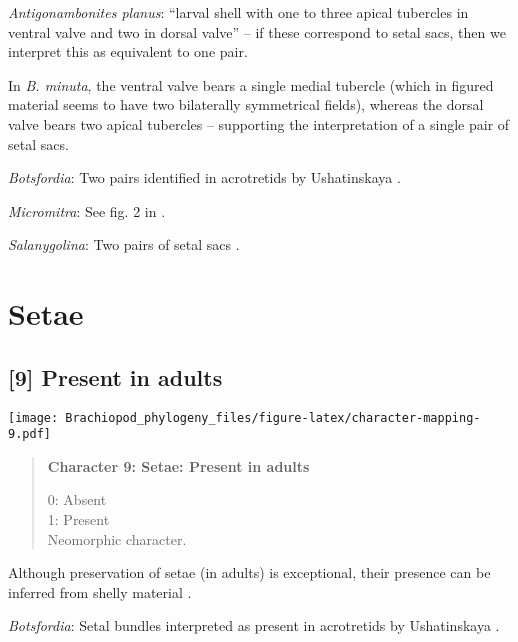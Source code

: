 \documentclass[openany]{book}
\theoremstyle{definition}
\theoremstyle{definition}
\theoremstyle{definition}
\theoremstyle{remark}
\begin{document}
\hypertarget{Antigonambonites_planus-coding-8}{}
\emph{Antigonambonites planus}: ``larval shell with one to three apical
tubercles in ventral valve and two in dorsal valve''
\citep{Williams2000LinguliformeaCraniiformea} -- if these correspond to
setal sacs, then we interpret this as equivalent to one pair.

In \emph{B. minuta}, the ventral valve bears a single medial tubercle
(which in figured material seems to have two bilaterally symmetrical
fields), whereas the dorsal valve bears two apical tubercles
\citep{Li2004} -- supporting the interpretation of a single pair of
setal sacs.

\hypertarget{Botsfordia-coding-8}{}
\emph{Botsfordia}: Two pairs identified in acrotretids by Ushatinskaya
\citeyearpar{Ushatinskaya2016Protegulumand}.

\hypertarget{Micromitra-coding-8}{}
\emph{Micromitra}: See fig. 2 in \citet{Balthasar2009Thebrachiopod}.

\hypertarget{Salanygolina-coding-8}{}
\emph{Salanygolina}: Two pairs of setal sacs
\citep{Popov2009Earlyontogeny}.

\section{Setae}\label{setae}

\subsection*{{[}9{]} Present in adults}\label{present-in-adults}

\texttt{[image: Brachiopod\_phylogeny\_files/figure-latex/character-mapping-9.pdf]}

\begin{quote}
\textbf{Character 9: Setae: Present in adults}

0: Absent\\
1: Present\\
Neomorphic character.
\end{quote}

Although preservation of setae (in adults) is exceptional, their
presence can be inferred from shelly material
\citep[see][]{Holmer2006Aspinose}.

\hypertarget{Botsfordia-coding-9}{}
\emph{Botsfordia}: Setal bundles interpreted as present in acrotretids
by Ushatinskaya \citeyearpar{Ushatinskaya2016Protegulumand}.
\end{document}
